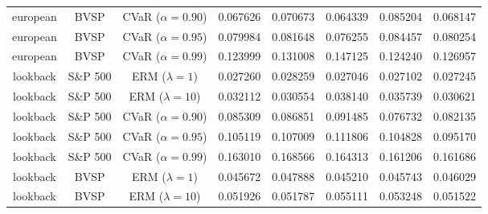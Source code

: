 \begin{table*}[htb]
\begin{tabular}{ccc|cc|ccc}
        european                      & BVSP                         & CVaR ($\alpha=0.90$)             & 0.067626            & 0.070673            & \color{red}0.064339          & 0.085204            & 0.068147            \\
        european                      & BVSP                         & CVaR ($\alpha=0.95$)             & 0.079984            & 0.081648            & \color{red}0.076255          & 0.084457            & 0.080254            \\
        european                      & BVSP                         & CVaR ($\alpha=0.99$)             & \color{red}0.123999 & 0.131008            & 0.147125                     & 0.124240            & 0.126957            \\\hline
        lookback                      & S\&P 500                     & ERM ($\lambda=1$)                & 0.027260            & 0.028259            & \color{red}0.027046          & 0.027102            & 0.027245            \\
        lookback                      & S\&P 500                     & ERM ($\lambda=10$)               & 0.032112            & \color{red}0.030554 & 0.038140                     & 0.035739            & 0.030621            \\
        lookback                      & S\&P 500                     & CVaR ($\alpha=0.90$)             & 0.085309            & 0.086851            & 0.091485                     & \color{red}0.076732 & 0.082135            \\
        lookback                      & S\&P 500                     & CVaR ($\alpha=0.95$)             & 0.105119            & 0.107009            & 0.111806                     & 0.104828            & \color{red}0.095170 \\
        lookback                      & S\&P 500                     & CVaR ($\alpha=0.99$)             & 0.163010            & 0.168566            & 0.164313                     & \color{red}0.161206 & 0.161686            \\\hline
        lookback                      & BVSP                         & ERM ($\lambda=1$)                & 0.045672            & 0.047888            & \color{red}0.045210          & 0.045743            & 0.046029            \\
        lookback                      & BVSP                         & ERM ($\lambda=10$)               & 0.051926            & 0.051787            & 0.055111                     & 0.053248            & \color{red}0.051522 \\

\end{tabular}
\end{table*}
